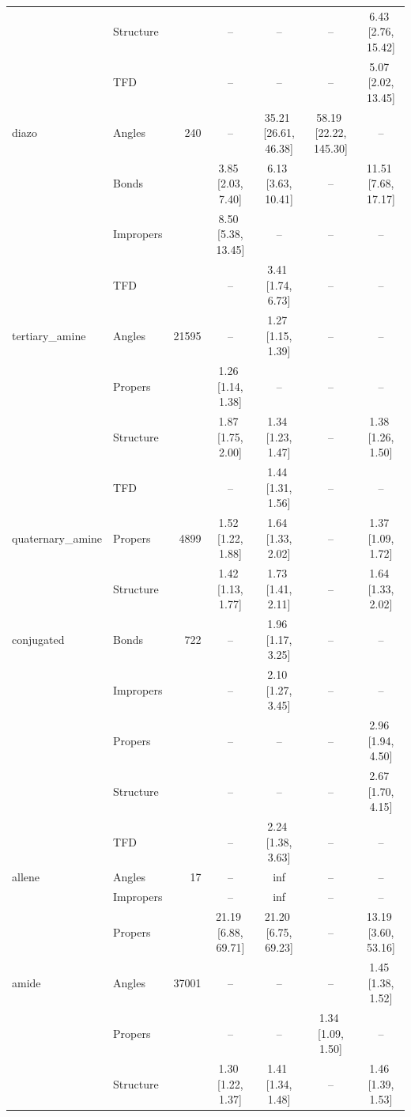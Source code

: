 \begin{longtable}[c]{ ll | r | c c c c}
     & Structure &  & -- & -- & -- & 6.43\,\,[2.76, 15.42] \\
     & TFD &  & -- & -- & -- & 5.07\,\,[2.02, 13.45] \\
    \hline
    diazo & Angles & 240 & -- & 35.21\,\,[26.61, 46.38] & 58.19\,\,[22.22, 145.30] & -- \\
     & Bonds &  & 3.85\,\,[2.03, 7.40] & 6.13\,\,[3.63, 10.41] & -- & 11.51\,\,[7.68, 17.17] \\
     & Impropers &  & 8.50\,\,[5.38, 13.45] & -- & -- & -- \\
     & TFD &  & -- & 3.41\,\,[1.74, 6.73] & -- & -- \\
    \hline
    tertiary\_amine & Angles & 21595 & -- & 1.27\,\,[1.15, 1.39] & -- & -- \\
     & Propers &  & 1.26\,\,[1.14, 1.38] & -- & -- & -- \\
     & Structure &  & 1.87\,\,[1.75, 2.00] & 1.34\,\,[1.23, 1.47] & -- & 1.38\,\,[1.26, 1.50] \\
     & TFD &  & -- & 1.44\,\,[1.31, 1.56] & -- & -- \\
    \hline
    quaternary\_amine & Propers & 4899 & 1.52\,\,[1.22, 1.88] & 1.64\,\,[1.33, 2.02] & -- & 1.37\,\,[1.09, 1.72] \\
     & Structure &  & 1.42\,\,[1.13, 1.77] & 1.73\,\,[1.41, 2.11] & -- & 1.64\,\,[1.33, 2.02] \\
    \hline
    conjugated & Bonds & 722 & -- & 1.96\,\,[1.17, 3.25] & -- & -- \\
     & Impropers &  & -- & 2.10\,\,[1.27, 3.45] & -- & -- \\
     & Propers &  & -- & -- & -- & 2.96\,\,[1.94, 4.50] \\
     & Structure &  & -- & -- & -- & 2.67\,\,[1.70, 4.15] \\
     & TFD &  & -- & 2.24\,\,[1.38, 3.63] & -- & -- \\
    \hline
    allene & Angles & 17 & -- & inf & -- & -- \\
     & Impropers &  & -- & inf & -- & -- \\
     & Propers &  & 21.19\,\,[6.88, 69.71] & 21.20\,\,[6.75, 69.23] & -- & 13.19\,\,[3.60, 53.16] \\
    \hline
    amide & Angles & 37001 & -- & -- & -- & 1.45\,\,[1.38, 1.52] \\
     & Propers &  & -- & -- & 1.34\,\,[1.09, 1.50] & -- \\
     & Structure &  & 1.30\,\,[1.22, 1.37] & 1.41\,\,[1.34, 1.48] & -- & 1.46\,\,[1.39, 1.53] \\

\end{longtable}
